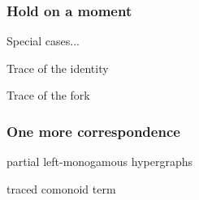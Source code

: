 \begin{frame}
    \frametitle{Hold on a moment}

    \centering
    \pause
    \LARGE
    \alert{Special cases...}

    \Large
    \pause
    \vspace{1em}

    \begin{minipage}{0.45\textwidth}
        \centering
        Trace of the identity

        \vspace{0.5em}

    \end{minipage}
    \quad
    \begin{minipage}{0.45\textwidth}
        \centering
        Trace of the fork

        \vspace{0.5em}

    \end{minipage}
\end{frame}
\begin{frame}
    \frametitle{One more correspondence}

    \centering

    \begin{minipage}{0.45\textwidth}
        \begin{center}
            partial left-monogamous hypergraphs
            \vspace{1em}

        \end{center}
    \end{minipage}
    \pause
    \quad
    \raisebox{-1em}{\(\leftrightarrow\)}
    \begin{minipage}{0.45\textwidth}
        \begin{center}
            traced comonoid term

            \vspace{1em}

        \end{center}
    \end{minipage}

    \pause
    \vspace{1.5em}

    \meanddan

\end{frame}